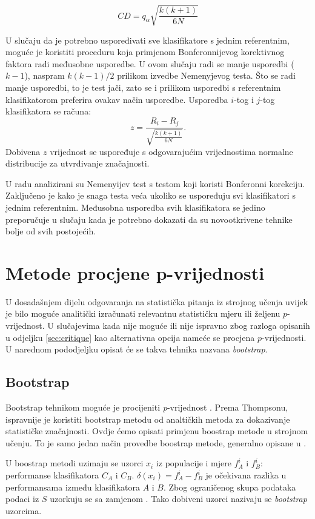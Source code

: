 $$
CD = q_{\alpha}\sqrt{\frac{k(k+1)}{6N}}
$$

U slučaju da je potrebno uspoređivati sve klasifikatore s jednim referentnim, moguće je koristiti proceduru koja primjenom Bonferonnijevog korektivnog faktora radi međusobne usporedbe. U ovom slučaju radi se manje usporedbi ($k-1$), naspram $k(k-1)/2$ prilikom izvedbe Nemenyjevog testa. Što se radi manje usporedbi, to je test jači, zato se i prilikom usporedbi s referentnim klasifikatorom preferira ovakav način usporedbe. Usporedba $i$-tog i $j$-tog klasifikatora se računa:
$$
z = \frac{R_i - R_j}{\sqrt{\frac{k(k+1)}{6N}}}.
$$
Dobivena $z$ vrijednost se uspoređuje s odgovarajućim vrijednostima normalne distribucije za utvrđivanje značajnosti. 

U radu \citep{demvsar2006statistical} analizirani su Nemenyijev test s testom koji koristi Bonferonni korekciju. Zaključeno je kako je snaga testa veća ukoliko se uspoređuju svi klasifikatori s jednim referentnim. Međusobna usporedba svih klasifikatora se jedino preporučuje u slučaju kada je potrebno dokazati da su novootkrivene tehnike bolje od svih postojećih.

\section{Metode procjene p-vrijednosti}

U dosadašnjem dijelu odgovaranja na statistička pitanja iz strojnog učenja uvijek je bilo moguće analitički izračunati relevantnu statističku mjeru ili željenu $p$-vrijednost. U slučajevima kada nije moguće ili nije ispravno zbog razloga opisanih u odjeljku \ref{sec:critique} kao alternativna opcija nameće se procjena $p$-vrijednosti. U narednom pododjeljku opisat će se takva tehnika nazvana \textit{bootstrap}.

\subsection{Bootstrap}

Bootstrap tehnikom moguće je procijeniti \textit{p}-vrijednost \citep{thompson1993use}. Prema Thompsonu, ispravnije je koristiti bootstrap metodu od analtičkih metoda za dokazivanje statističke značajnosti. Ovdje ćemo opisati primjenu boostrap metode u strojnom učenju. To je samo jedan način provedbe boostrap metode, generalno opisane u \citep{efron1993introduction}. 

U boostrap metodi \citep{berg2012empirical} uzimaju se uzorci $x_i$ iz populacije i mjere  $f_{A}^{i}$ i $f_{B}^{i}$: performanse klasifikatora $C_A$ i $C_B$. $\delta(x_i) = f_{A}^{i} - f_{B}^{i}$ je očekivana razlika u performansama između klasifikatora $A$ i $B$. Zbog ograničenog skupa podataka podaci iz $S$ uzorkuju se sa zamjenom . Tako dobiveni uzorci nazivaju se \textit{bootstrap} uzorcima.

